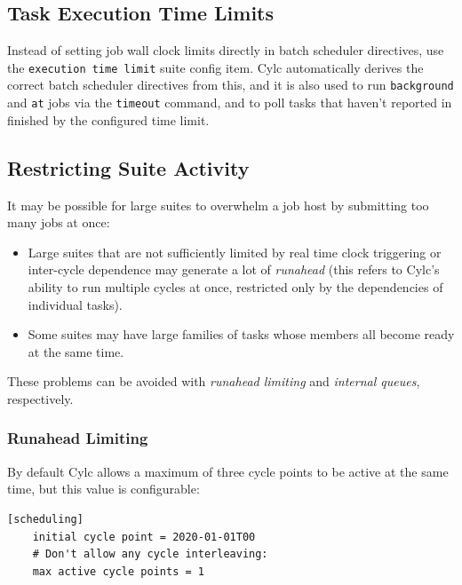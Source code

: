 \subsection{Task Execution Time Limits}

Instead of setting job wall clock limits directly in batch scheduler
directives, use the \lstinline=execution time limit= suite config item.
Cylc automatically derives the correct batch scheduler directives from this,
and it is also used to run \lstinline=background= and \lstinline=at= jobs via
the \lstinline=timeout= command, and to poll tasks that haven't reported in
finished by the configured time limit.

\subsection{Restricting Suite Activity}
\label{Restricting Suite Activity}

It may be possible for large suites to overwhelm a job host by submitting too
many jobs at once:

\begin{itemize}
  \item Large suites that are not sufficiently limited by real time clock
      triggering or inter-cycle dependence may generate a lot of {\em runahead}
      (this refers to Cylc's ability to run multiple cycles at once, restricted
      only by the dependencies of individual tasks).
  \item Some suites may have large families of tasks whose members all
    become ready at the same time.
\end{itemize}

These problems can be avoided with {\em runahead limiting} and {\em internal
queues}, respectively.

\subsubsection{Runahead Limiting}
\label{Runahead Limiting}

By default Cylc allows a maximum of three cycle points to be active at the same time, but this value is configurable:

\lstset{language=suiterc}
\begin{lstlisting}
[scheduling]
    initial cycle point = 2020-01-01T00
    # Don't allow any cycle interleaving:
    max active cycle points = 1
\end{lstlisting}

